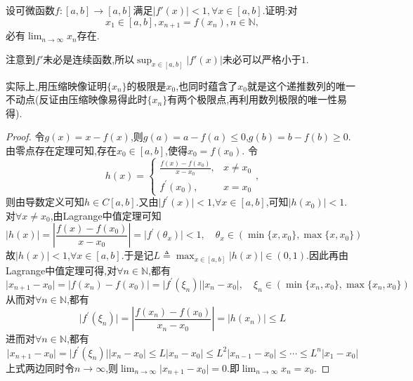 \documentclass[../../main.tex]{subfiles}%
\begin{document}
\begin{proposition}[加强的压缩映像]\label{proposition:加强的压缩映像}
设可微函数\(f:[a,b]\to[a,b]\)满足\(\vert f'(x)\vert<1,\forall x\in[a,b]\).证明:对
\[
x_1\in[a,b],x_{n + 1} = f(x_n),n\in\mathbb{N},
\]
必有\(\lim_{n \to \infty} x_n\)存在.  
\end{proposition}
\begin{remark}
注意到\(f'\)未必是连续函数,所以\(\sup_{x\in[a,b]}\vert f'(x)\vert\)未必可以严格小于\(1\).
\end{remark}
\begin{note}
实际上,用压缩映像证明$\{x_n\}$的极限是$x_0$,也同时蕴含了$x_0$就是这个递推数列的唯一不动点(反证由压缩映像易得此时$\{x_n\}$有两个极限点,再利用数列极限的唯一性易得).
\end{note}
\begin{proof}

令\(g(x)=x - f(x)\),则\(g(a)=a - f(a)\leqslant0\),\(g(b)=b - f(b)\geqslant0\).由零点存在定理可知,存在\(x_0\in[a,b]\),使得\(x_0 = f(x_0)\).
令\[h(x)=\begin{cases}
\frac{f(x) - f(x_0)}{x - x_0},&x\neq x_0\\
f^\prime(x_0),&x = x_0
\end{cases},\]则由导数定义可知\(h\in C[a,b]\).又由\(\vert f^\prime(x)\vert<1\),\(\forall x\in[a,b]\),可知\(\vert h(x_0)\vert<1\).
对\(\forall x\neq x_0\),由Lagrange中值定理可知
\[
\vert h(x)\vert=\left\vert\frac{f(x) - f(x_0)}{x - x_0}\right\vert=\vert f^\prime(\theta_x)\vert<1,\quad\theta_x\in(\min\{x,x_0\},\max\{x,x_0\})
\]
故\(\vert h(x)\vert<1\),\(\forall x\in[a,b]\).于是记\(L\triangleq\max_{x\in[a,b]}\vert h(x)\vert\in(0,1)\).因此再由Lagrange中值定理可得,对\(\forall n\in\mathbb{N}\),都有
\[
\vert x_{n + 1}-x_0\vert=\vert f(x_n) - f(x_0)\vert=\vert f^\prime(\xi_n)\vert\vert x_n - x_0\vert,\quad\xi_n\in(\min\{x_n,x_0\},\max\{x_n,x_0\})
\]
从而对\(\forall n\in\mathbb{N}\),都有
\[
\vert f^\prime(\xi_n)\vert=\left\vert\frac{f(x_n) - f(x_0)}{x_n - x_0}\right\vert=\vert h(x_n)\vert\leqslant L
\]
进而对\(\forall n\in\mathbb{N}\),都有
\[
\vert x_{n + 1}-x_0\vert=\vert f^\prime(\xi_n)\vert\vert x_n - x_0\vert\leqslant L\vert x_n - x_0\vert\leqslant L^2\vert x_{n - 1}-x_0\vert\leqslant\cdots\leqslant L^n\vert x_1 - x_0\vert
\]
上式两边同时令\(n\rightarrow\infty\),则\(\lim_{n\rightarrow\infty}\vert x_{n + 1}-x_0\vert = 0\).即\(\lim_{n\rightarrow\infty}x_n = x_0\).

\end{proof}
\end{document}
